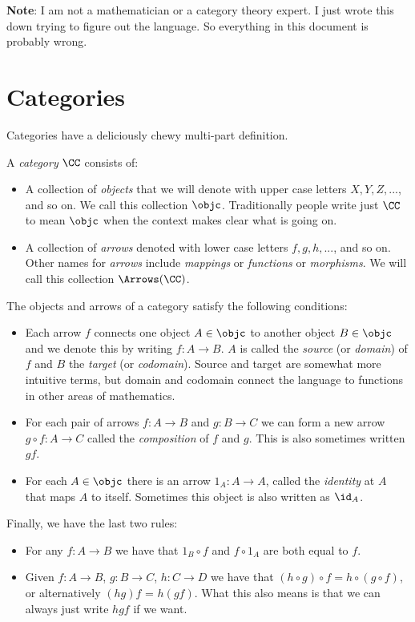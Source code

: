 \pg
{\bf Note}: I am not a mathematician or a category theory expert. I just wrote this down
trying to figure out the language. So everything in this document is probably wrong.

\goodbreak
\section{Categories}

Categories have a deliciously chewy multi-part definition.

\begin{defn}
\label{category}
A {\it category} $\CC$ consists of:
%
\begin{itemize}
\item 
A collection of {\it objects} that we will denote with upper case letters $X, Y, Z, ...$,
and so on.  
We call this collection $\objc$. Traditionally people write just $\CC$ to mean $\objc$
when the context makes clear what is going on.
\item
A collection of {\it arrows} denoted with lower case letters $f, g, h, ...$, and so on.
Other names for {\it arrows} include {\it mappings} or {\it functions} or {\it morphisms}.
We will call this collection $\Arrows(\CC)$. \end{itemize}%
The objects and arrows of a category satisfy the following conditions:
\begin{itemize}
\item
Each arrow $f$ connects one object $A \in \objc$ to another object $B \in \objc$ and we denote
this by writing $f: A \to B$. $A$ is called the {\it source} (or {\it domain}) of $f$ and $B$ the {\it target} (or 
{\it codomain}). Source and target are somewhat more intuitive terms, but domain and codomain connect the language
to functions in other areas of mathematics.
\item
For each pair of arrows $f:A \to B$ and $g : B \to C$ we can form a new arrow $g \circ f:
A \to C$ called the {\it composition} of $f$ and $g$. This is also sometimes written $gf$.
\item
For each $A \in \objc$ there is an arrow $1_A: A \to A$, called the {\it identity} at
$A$ that maps $A$ to itself. Sometimes this object is also written as $\id_A$.
\end{itemize}
\goodbreak\noindent Finally, we have the last two rules:

\begin{itemize}
\item For any $f: A \to B$ we have that $1_B \circ f$ and $f \circ 1_A$ are both equal to
$f$. 
\item Given $f: A \to B$, $g: B \to C$, $h: C\to D$ we have that $(h \circ g) \circ f = h
\circ (g \circ f)$, or alternatively $(hg)f$ = $h(gf)$. What this also means is that we
can always just write $hgf$ if we want. \end{itemize}%
\end{defn}%
